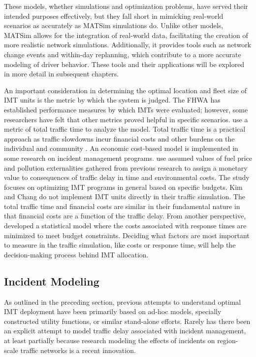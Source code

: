 \documentclass[
  letterpaper,
  authoryear]{elsarticle}
\begin{document}
These models, whether simulations and optimization problems, have served
their intended purposes effectively, but they fall short in mimicking
real-world scenarios as accurately as MATSim simulations do. Unlike
other models, MATSim allows for the integration of real-world data,
facilitating the creation of more realistic network simulations.
Additionally, it provides tools such as network change events and
within-day replanning, which contribute to a more accurate modeling of
driver behavior. These tools and their applications will be explored in
more detail in subsequent chapters.

An important consideration in determining the optimal location and fleet
size of IMT units is the metric by which the system is judged. The FHWA
has established performance measures by which IMTs were evaluated;
however, some researchers have felt that other metrics proved helpful in
specific scenarios. \citet{pal2002} use a metric of total traffic time
to analyze the model. Total traffic time is a practical approach as
traffic slowdowns incur financial costs and other burdens on the
individual and community \citep{bivina2016}. An economic cost-based
model is implemented in some research on incident management programs.
\citet{kim2012} use assumed values of fuel price and pollution
externalities gathered from previous research to assign a monetary value
to consequences of traffic delay in time and environmental costs. The
study focuses on optimizing IMT programs in general based on specific
budgets. Kim and Chang do not implement IMT units directly in their
traffic simulation. The total traffic time and financial costs are
similar in their fundamental nature in that financial costs are a
function of the traffic delay. From another perspective,
\citet{ozbay2013} developed a statistical model where the costs
associated with response times are minimized to meet budget constraints.
Deciding what factors are most important to measure in the traffic
simulation, like costs or response time, will help the decision-making
process behind IMT allocation.

\hypertarget{incident-modeling}{%
\subsection{Incident Modeling}\label{incident-modeling}}

As outlined in the preceding section, previous attempts to understand
optimal IMT deployment have been primarily based on ad-hoc models,
specially constructed utility functions, or similar stand-alone efforts.
Rarely has there been an explicit attempt to model traffic delay
associated with incident management, at least partially because research
modeling the effects of incidents on region-scale traffic networks is a
recent innovation.
\end{document}

